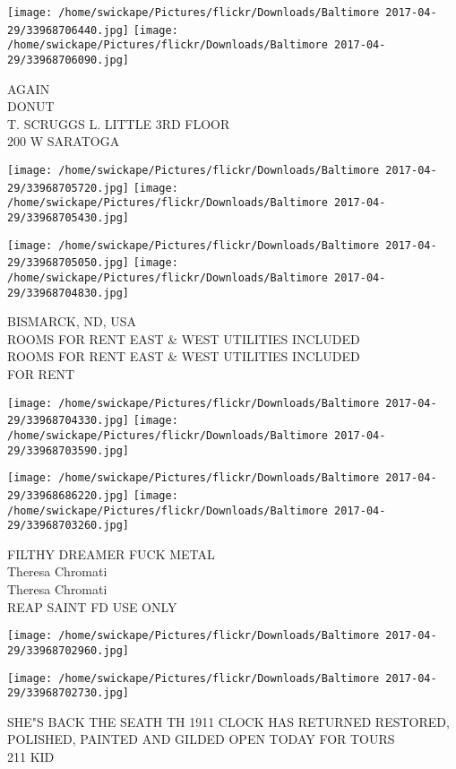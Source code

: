 \documentclass[10pt,letterpaper]{article}
\begin{document}
\texttt{[image: /home/swickape/Pictures/flickr/Downloads/Baltimore 2017-04-29/33968706440.jpg]}
\texttt{[image: /home/swickape/Pictures/flickr/Downloads/Baltimore 2017-04-29/33968706090.jpg]}

AGAIN\\
DONUT\\
T. SCRUGGS L. LITTLE 3RD FLOOR\\
200 W SARATOGA
\pagebreak

\texttt{[image: /home/swickape/Pictures/flickr/Downloads/Baltimore 2017-04-29/33968705720.jpg]}
\texttt{[image: /home/swickape/Pictures/flickr/Downloads/Baltimore 2017-04-29/33968705430.jpg]}

\texttt{[image: /home/swickape/Pictures/flickr/Downloads/Baltimore 2017-04-29/33968705050.jpg]}
\texttt{[image: /home/swickape/Pictures/flickr/Downloads/Baltimore 2017-04-29/33968704830.jpg]}

BISMARCK, ND, USA\\
ROOMS FOR RENT EAST \& WEST UTILITIES INCLUDED\\
ROOMS FOR RENT EAST \& WEST UTILITIES INCLUDED\\
FOR RENT
\pagebreak

\texttt{[image: /home/swickape/Pictures/flickr/Downloads/Baltimore 2017-04-29/33968704330.jpg]}
\texttt{[image: /home/swickape/Pictures/flickr/Downloads/Baltimore 2017-04-29/33968703590.jpg]}

\texttt{[image: /home/swickape/Pictures/flickr/Downloads/Baltimore 2017-04-29/33968686220.jpg]}
\texttt{[image: /home/swickape/Pictures/flickr/Downloads/Baltimore 2017-04-29/33968703260.jpg]}

FILTHY DREAMER FUCK METAL\\
Theresa Chromati\\
Theresa Chromati\\
REAP SAINT FD USE ONLY
\pagebreak

\texttt{[image: /home/swickape/Pictures/flickr/Downloads/Baltimore 2017-04-29/33968702960.jpg]}

\vspace{0.25in}
\texttt{[image: /home/swickape/Pictures/flickr/Downloads/Baltimore 2017-04-29/33968702730.jpg]}

SHE"S BACK THE SEATH TH 1911 CLOCK HAS RETURNED RESTORED, POLISHED, PAINTED AND GILDED OPEN TODAY FOR TOURS\\
211 KID
\pagebreak
\end{document}
